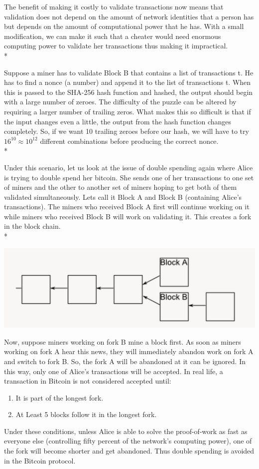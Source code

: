 The benefit of making it costly to validate transactions now means that validation does not depend on the amount of network identities that a person has but depends on the amount of computational power that he has. With a small modification, we can make it such that a cheater would need enormous computing power to validate her transactions thus making it impractical. \\*

Suppose a miner has to validate Block B that contains a list of transactions t. He has to find a nonce (a number) and append it to the list of transactions t. When this is passed to the SHA-256 hash function and hashed, the output should begin with a large number of zeroes. The difficulty of the puzzle can be altered by requiring a larger number of trailing zeros. What makes this so difficult is that if the input changes even a little, the output from the hash function changes completely. So, if we want 10 trailing zeroes before our hash, we will have to try $16^{10} \approx 10^{12}$ different combinations before producing the correct nonce. \\*

Under this scenario, let us look at the issue of double spending again where Alice is trying to double spend her bitcoin. She sends one of her transactions to one set of miners and the other to another set of miners hoping to get both of them validated simultaneously. Lets call it Block A and Block B (containing Alice’s transactions). The miners who received Block A first will continue working on it while miners who received Block B will work on validating it. This creates a fork in the block chain. \\*
\begin{center}
\includegraphics[scale=0.5]{images/fork.png}
\end{center}

Now, suppose miners working on fork B mine a block first. As soon as miners working on fork A hear this news, they will immediately abandon work on fork A and switch to fork B. So, the fork A will be abandoned at it can be ignored. In this way, only one of Alice’s transactions will be accepted. In real life, a transaction in Bitcoin is not considered accepted until:

\begin{enumerate}
\item It is part of the longest fork.
\item At Least 5 blocks follow it in the longest fork.
\end{enumerate}

Under these conditions, unless Alice is able to solve the proof-of-work as fast as everyone else (controlling fifty percent of the network’s computing power), one of the fork will become shorter and get abandoned. Thus double spending is avoided in the Bitcoin protocol.